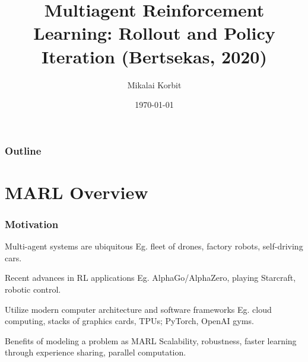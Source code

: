 \documentclass{beamer}
\title[MARL]{Multiagent Reinforcement Learning:
Rollout and Policy Iteration
    (Bertsekas, 2020)}
\author{Mikalai Korbit} %
\institute[IMT] %
{
    IMT School for Advanced Studies Lucca %
}
\date{\today} %
\begin{document}
    \begin{frame}
        \titlepage %
    \end{frame}

    \begin{frame}
        \frametitle{Outline} %
        \tableofcontents %
    \end{frame}






    \section{MARL Overview}




    \begin{frame}
        \frametitle{Motivation}

        \begin{block}{Multi-agent systems are ubiquitous}
            Eg. fleet of drones, factory robots, self-driving cars.
        \end{block}

        \begin{block}{Recent advances in RL applications}
            Eg. AlphaGo/AlphaZero, playing Starcraft, robotic control.
        \end{block}

        \begin{block}{Utilize modern computer architecture and software frameworks}
            Eg. cloud computing, stacks of graphics cards, TPUs;
            PyTorch, OpenAI gyms.
        \end{block}

        \begin{block}{Benefits of modeling a problem as MARL}
            Scalability, robustness, faster learning through experience sharing,
            parallel computation.
        \end{block}

    \end{frame}
\end{document}
